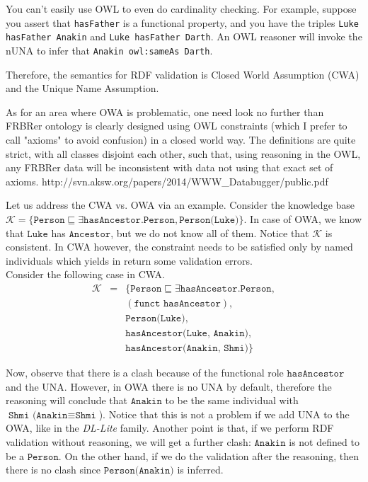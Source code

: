 \documentclass{llncs}
\newcommand{\ms}[1]{\texttt{#1}}
\newcommand{\tb}[1]{\todo[size=\small, color=green!40]{\textbf{Thomas:} #1}}
\begin{document}
You can't easily use OWL to even do cardinality checking. 
For example, suppose you assert that \ms{hasFather} is a functional property, and you have the triples \ms{Luke hasFather Anakin} and \ms{Luke hasFather Darth}.
An OWL reasoner will invoke the nUNA to infer that \ms{Anakin owl:sameAs Darth}.

Therefore, the semantics for RDF validation is Closed World Assumption (CWA) and the Unique Name Assumption.
 
As for an area where OWA is problematic, one need look no further than
FRBRer ontology is clearly designed using OWL constraints
(which I prefer to call "axioms" to avoid confusion) in a closed world
way. The definitions are quite strict, with all classes disjoint each
other, such that, using reasoning in the OWL, any FRBRer data will be
inconsistent with data not using that exact set of axioms. 
http://svn.aksw.org/papers/2014/WWW\_Databugger/public.pdf


Let us address the CWA vs. OWA via an example. Consider the knowledge base  $\mathcal{K} = \{\ms{Person} \sqsubseteq \exists \ms{hasAncestor.Person}, \ms{Person(Luke)}\}$. In case of OWA, we know that $\ms{Luke}$ has $\ms{Ancestor}$, but we do not know all of them. Notice that $\mathcal{K}$ is consistent. In CWA however, the constraint needs to be satisfied only by named individuals which yields in return some validation errors.\\
Consider the following case in CWA. 
\begin{eqnarray*}
\mathcal{K} &=  & \{\ms{Person} \sqsubseteq \exists \ms{hasAncestor.Person}, \\
 &&(\ms{funct }  \ms{hasAncestor}),\\  && \ms{Person(Luke)},\\ && \ms{hasAncestor(Luke, Anakin)},\\  && \ms{hasAncestor(Anakin, Shmi)}\}
\end{eqnarray*}

\noindent Now, observe that there is a clash because of the functional role $\ms{hasAncestor}$ and the UNA. However, in OWA there is no UNA by default, therefore the reasoning will conclude that  $\ms{Anakin}$ to be the same individual with $\ms{Shmi (Anakin} \equiv \ms{Shmi}$). Notice that this is not a problem if we add UNA to the OWA, like in the \textit{DL-Lite} family.
Another point is that, if we perform RDF validation without reasoning, we will get a further clash: $\ms{Anakin}$ is not defined to be a $\ms{Person}$. On the other hand, if we do the validation after the reasoning, then there is no clash since $\ms{Person(Anakin)}$ is inferred. 
\end{document}
